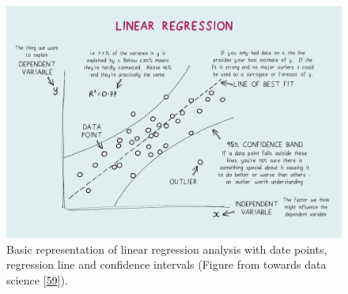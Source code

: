 \documentclass[a4paper,11pt]{article}
\begin{document}
\begin{figure}

{\centering \includegraphics[width=1\linewidth]{figures/regression} 

}

\caption{Basic representation of linear regression analysis with date points, regression line and confidence intervals (Figure from towards data science {[}\protect\hyperlink{ref-JasonWong.2020}{59}{]}).}\label{fig:regression}
\end{figure}
\end{document}
